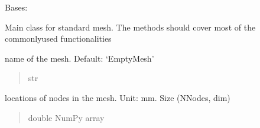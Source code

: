 \documentclass[letterpaper,10pt,english]{sphinxmanual}
\begin{document}
\begin{fulllineitems}
\label{\detokenize{_autosummary/nirfasterff.base.dcs_mesh.dcsmesh:nirfasterff.base.dcs_mesh.dcsmesh}}
\pysigstartsignatures
\pysigline
{}
\pysigstopsignatures
\sphinxAtStartPar
Bases: {\hyperref[\detokenize{_autosummary/nirfasterff.base.mesh.mesh:nirfasterff.base.mesh.mesh}]{}}

\sphinxAtStartPar
Main class for standard mesh. The methods should cover most of the commonly\sphinxhyphen{}used functionalities

\begin{fulllineitems}
\label{\detokenize{_autosummary/nirfasterff.base.dcs_mesh.dcsmesh:nirfasterff.base.dcs_mesh.dcsmesh.name}}
\pysigstartsignatures
\pysigline
{}
\pysigstopsignatures
\sphinxAtStartPar
name of the mesh. Default: ‘EmptyMesh’
\begin{quote}\begin{description}
\sphinxAtStartPar
str

\end{description}\end{quote}

\end{fulllineitems}


\begin{fulllineitems}
\label{\detokenize{_autosummary/nirfasterff.base.dcs_mesh.dcsmesh:nirfasterff.base.dcs_mesh.dcsmesh.nodes}}
\pysigstartsignatures
\pysigline
{}
\pysigstopsignatures
\sphinxAtStartPar
locations of nodes in the mesh. Unit: mm. Size (NNodes, dim)
\begin{quote}\begin{description}
\sphinxAtStartPar
double NumPy array

\end{description}\end{quote}

\end{fulllineitems}


\end{fulllineitems}
\end{document}
